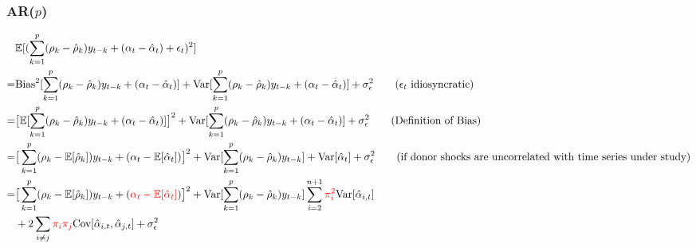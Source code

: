 \documentclass[9pt]{beamer}
\def\E{\mathbb{E}} %
\theoremstyle{definition}
\begin{document}
\begin{frame}\frametitle{AR($p$)}
      \begin{align*}
        &\E[(\sum^{p}_{k=1}(\rho_{k}-\hat\rho_{k})y_{t-k} + (\alpha_{t} - \hat{\alpha}_{t}) + \epsilon_{t} )^{2}]\notag\\
        = &\text{Bias}^{2}[\sum^{p}_{k=1}(\rho_{k}-\hat\rho_{k})y_{t-k} + (\alpha_{t} - \hat{\alpha}_{t}) ] + \text{Var}[\sum^{p}_{k=1}(\rho_{k}-\hat\rho_{k})y_{t-k} + (\alpha_{t} - \hat{\alpha}_{t}) ] + \sigma^{2}_{\epsilon}\tag{$\epsilon_{t}$ idiosyncratic}\\
        = &\big[\E[\sum^{p}_{k=1}(\rho_{k}-\hat\rho_{k})y_{t-k} + (\alpha_{t} - \hat{\alpha}_{t}) ]\big]^{2} + \text{Var}[\sum^{p}_{k=1}(\rho_{k}-\hat\rho_{k})y_{t-k} + (\alpha_{t} - \hat{\alpha}_{t})]  + \sigma^{2}_{\epsilon}\tag{Definition of Bias}\\
        = &\big[\sum^{p}_{k=1}(\rho_{k}-\E[\hat\rho_{k}])y_{t-k} + (\alpha_{t} - \E[\hat{\alpha}_{t}]) \big]^{2} + \text{Var}[\sum^{p}_{k=1}(\rho_{k}-\hat\rho_{k})y_{t-k}] + \text{Var}[\hat{\alpha}_{t}]  + \sigma^{2}_{\epsilon}\tag{if donor shocks are uncorrelated with time series under study}\\
        = &\big[\sum^{p}_{k=1}(\rho_{k}-\E[\hat\rho_{k}])y_{t-k} + (\textcolor{red}{\alpha_{t} - \E[\hat{\alpha}_{t}]}) \big]^{2} + \text{Var}[\sum^{p}_{k=1}(\rho_{k}-\hat\rho_{k})y_{t-k}] 
        \sum_{i=2}^{n+1}\textcolor{red}{\pi_{i}^{2}}\text{Var}[\hat\alpha_{i,t}] \\
        & + 2\sum_{i\neq j}\textcolor{red}{\pi_{i}\pi_{j}}\text{Cov}[\hat\alpha_{i,t},\hat\alpha_{j,t}]  + \sigma^{2}_{\epsilon}
      \end{align*}
\end{frame}
\end{document}
